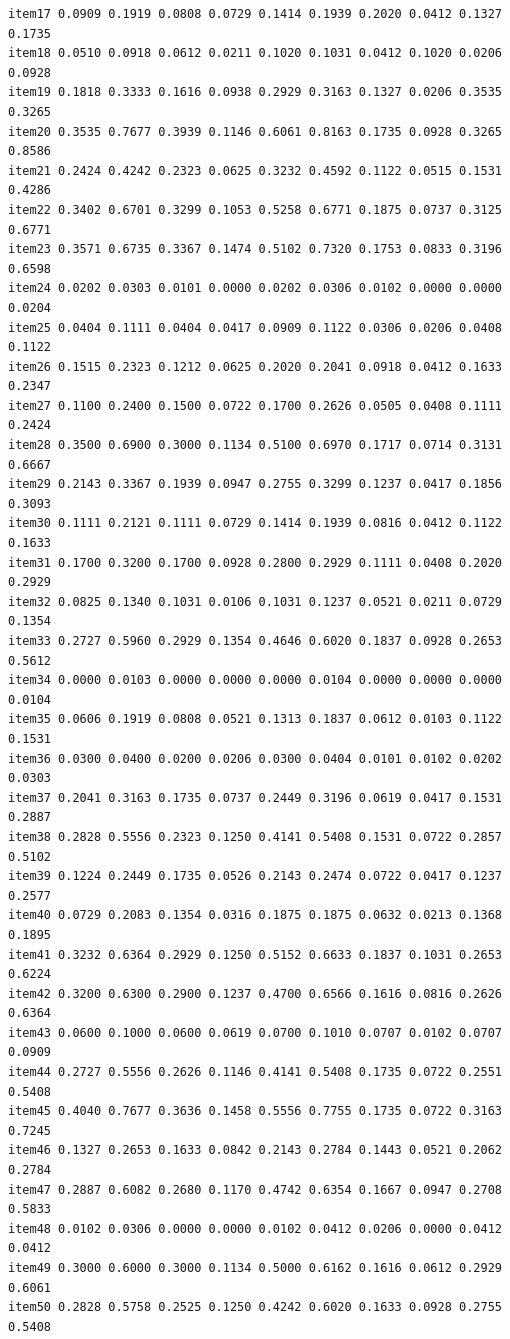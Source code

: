 \documentclass[
  a4paper,
]{ltjsbook}
\begin{document}
\begin{verbatim}
item17 0.0909 0.1919 0.0808 0.0729 0.1414 0.1939 0.2020 0.0412 0.1327 0.1735
item18 0.0510 0.0918 0.0612 0.0211 0.1020 0.1031 0.0412 0.1020 0.0206 0.0928
item19 0.1818 0.3333 0.1616 0.0938 0.2929 0.3163 0.1327 0.0206 0.3535 0.3265
item20 0.3535 0.7677 0.3939 0.1146 0.6061 0.8163 0.1735 0.0928 0.3265 0.8586
item21 0.2424 0.4242 0.2323 0.0625 0.3232 0.4592 0.1122 0.0515 0.1531 0.4286
item22 0.3402 0.6701 0.3299 0.1053 0.5258 0.6771 0.1875 0.0737 0.3125 0.6771
item23 0.3571 0.6735 0.3367 0.1474 0.5102 0.7320 0.1753 0.0833 0.3196 0.6598
item24 0.0202 0.0303 0.0101 0.0000 0.0202 0.0306 0.0102 0.0000 0.0000 0.0204
item25 0.0404 0.1111 0.0404 0.0417 0.0909 0.1122 0.0306 0.0206 0.0408 0.1122
item26 0.1515 0.2323 0.1212 0.0625 0.2020 0.2041 0.0918 0.0412 0.1633 0.2347
item27 0.1100 0.2400 0.1500 0.0722 0.1700 0.2626 0.0505 0.0408 0.1111 0.2424
item28 0.3500 0.6900 0.3000 0.1134 0.5100 0.6970 0.1717 0.0714 0.3131 0.6667
item29 0.2143 0.3367 0.1939 0.0947 0.2755 0.3299 0.1237 0.0417 0.1856 0.3093
item30 0.1111 0.2121 0.1111 0.0729 0.1414 0.1939 0.0816 0.0412 0.1122 0.1633
item31 0.1700 0.3200 0.1700 0.0928 0.2800 0.2929 0.1111 0.0408 0.2020 0.2929
item32 0.0825 0.1340 0.1031 0.0106 0.1031 0.1237 0.0521 0.0211 0.0729 0.1354
item33 0.2727 0.5960 0.2929 0.1354 0.4646 0.6020 0.1837 0.0928 0.2653 0.5612
item34 0.0000 0.0103 0.0000 0.0000 0.0000 0.0104 0.0000 0.0000 0.0000 0.0104
item35 0.0606 0.1919 0.0808 0.0521 0.1313 0.1837 0.0612 0.0103 0.1122 0.1531
item36 0.0300 0.0400 0.0200 0.0206 0.0300 0.0404 0.0101 0.0102 0.0202 0.0303
item37 0.2041 0.3163 0.1735 0.0737 0.2449 0.3196 0.0619 0.0417 0.1531 0.2887
item38 0.2828 0.5556 0.2323 0.1250 0.4141 0.5408 0.1531 0.0722 0.2857 0.5102
item39 0.1224 0.2449 0.1735 0.0526 0.2143 0.2474 0.0722 0.0417 0.1237 0.2577
item40 0.0729 0.2083 0.1354 0.0316 0.1875 0.1875 0.0632 0.0213 0.1368 0.1895
item41 0.3232 0.6364 0.2929 0.1250 0.5152 0.6633 0.1837 0.1031 0.2653 0.6224
item42 0.3200 0.6300 0.2900 0.1237 0.4700 0.6566 0.1616 0.0816 0.2626 0.6364
item43 0.0600 0.1000 0.0600 0.0619 0.0700 0.1010 0.0707 0.0102 0.0707 0.0909
item44 0.2727 0.5556 0.2626 0.1146 0.4141 0.5408 0.1735 0.0722 0.2551 0.5408
item45 0.4040 0.7677 0.3636 0.1458 0.5556 0.7755 0.1735 0.0722 0.3163 0.7245
item46 0.1327 0.2653 0.1633 0.0842 0.2143 0.2784 0.1443 0.0521 0.2062 0.2784
item47 0.2887 0.6082 0.2680 0.1170 0.4742 0.6354 0.1667 0.0947 0.2708 0.5833
item48 0.0102 0.0306 0.0000 0.0000 0.0102 0.0412 0.0206 0.0000 0.0412 0.0412
item49 0.3000 0.6000 0.3000 0.1134 0.5000 0.6162 0.1616 0.0612 0.2929 0.6061
item50 0.2828 0.5758 0.2525 0.1250 0.4242 0.6020 0.1633 0.0928 0.2755 0.5408

\end{verbatim}
\end{document}

